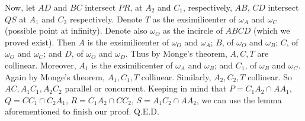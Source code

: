 \documentclass[11pt,a4paper]{article}
\begin{document}
\begin{enumerate}
Now, let $AD$ and $BC$ intersect $PR$, at $A_2$ and $C_1$, respectively, $AB$, $CD$ intersect $QS$ at $A_1$ and $C_2$ respectively. 
Denote $T$ as the exsimilicenter of $\omega_A$ and $\omega_C$ (possible point at infinity). 
Denote also $\omega_O$ as the incircle of $ABCD$ (which we proved exist). 
Then $A$ is the exsimilicenter of $\omega_O$ and $\omega_A$; $B$, of $\omega_O$ and $\omega_B$; 
$C$, of $\omega_O$ and $\omega_C$; 
and $D$, of $\omega_O$ and $\omega_D$. 
Thus by Monge's theorem, $A, C, T$ are collinear. 
Moreover, $A_1$ is the exsimilicenter of $\omega_A$ and $\omega_B$; and $C_1$, of $\omega_B$ and $\omega_C$. 
Again by Monge's theorem, $A_1, C_1, T$ collinear. 
Similarly, $A_2, C_2, T$ collinear. 
So $AC, A_1C_1, A_2C_2$ parallel or concurrent. 
Keeping in mind that $P=C_1A_2\cap AA_1$, $Q=CC_1\cap C_2A_1$, $R=C_1A_2\cap CC_2$, $S=A_1C_2\cap AA_2$, 
we can use the lemma aforementioned to finish our proof. Q.E.D. 

\end{enumerate}
\end{document}
